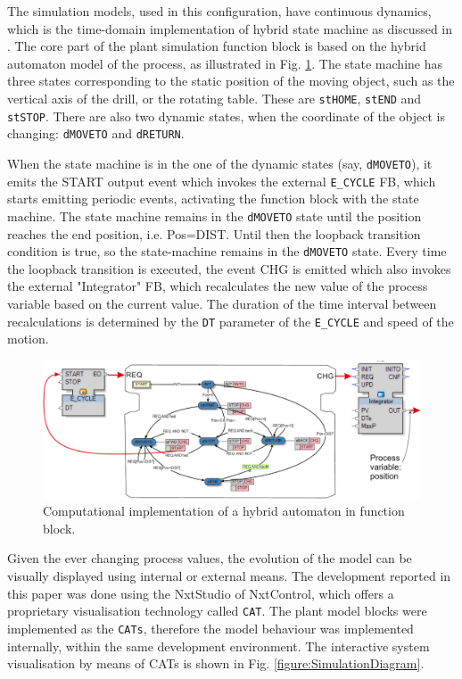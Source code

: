 \begin{bibunit}
The simulation models, used in this configuration, have continuous dynamics, which is the time-domain implementation of hybrid state machine as discussed in \cite{vyatkin2008closed}. 
The core part of the plant simulation function block is based on the hybrid automaton model of the process, as illustrated in Fig. \ref{figure:Hybrid}.
The state machine has three states corresponding to the static position of the moving object, such as the vertical axis of the drill, or the rotating table. These are \texttt{stHOME}, \texttt{stEND} and \texttt{stSTOP}. There are also two dynamic states, when the coordinate of the object is changing: \texttt{dMOVETO} and \texttt{dRETURN}. 

When the state machine is in the one of the dynamic states (say, \texttt{dMOVETO}), it emits the START output event which invokes the external \texttt{E\_CYCLE} FB, which starts emitting periodic events, activating the function block with the state machine. 
The state machine remains in the \texttt{dMOVETO} state until the position reaches the end position, i.e. Pos=DIST. Until then the loopback transition condition is true, so the state-machine remains in the \texttt{dMOVETO} state. Every time the loopback transition is executed, the event CHG is emitted which also invokes the external "Integrator" FB, which recalculates the new value of the process variable based on the current value. The duration of the time interval between recalculations is determined by the \texttt{DT} parameter of the \texttt{E\_CYCLE} and speed of the motion. 

\begin{figure}[h]
    \centering
    \includegraphics[scale = 0.36]{MX_Papers/Paper2/images/hybrid.pdf}
    \caption{Computational implementation of a hybrid automaton in function block.}
    \label{figure:Hybrid}
\end{figure}

Given the ever changing process values, the evolution of the model can be visually displayed using internal or external means. The development reported in this paper was done using the NxtStudio of NxtControl, which offers a proprietary visualisation technology called \texttt{CAT}. The plant model blocks were implemented as the \texttt{CATs}, therefore the model behaviour was implemented internally, within the same development environment. The interactive system visualisation by means of CATs is shown in Fig. \ref{figure:SimulationDiagram}.


\end{bibunit}
